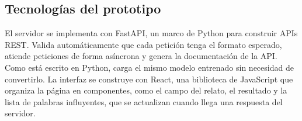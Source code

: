 \subsection{Tecnologías del prototipo}
El servidor se implementa con FastAPI, un marco de Python para construir APIs REST. Valida automáticamente que cada petición tenga el formato esperado, atiende peticiones de forma asíncrona y genera la documentación de la API. Como está escrito en Python, carga el mismo modelo entrenado sin necesidad de convertirlo. La interfaz se construye con React, una biblioteca de JavaScript que organiza la página en componentes, como el campo del relato, el resultado y la lista de palabras influyentes, que se actualizan cuando llega una respuesta del servidor.
